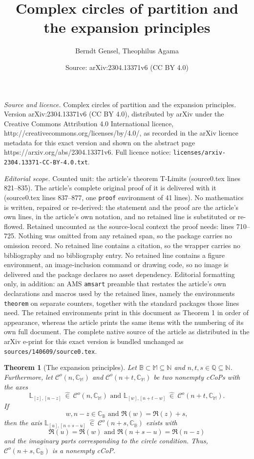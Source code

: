 \documentclass[10pt,a4paper]{amsart}
\title{Complex circles of partition and the expansion principles}
\author{Berndt Gensel, Theophilus Agama}
\date{Source: arXiv:2304.13371v6 (CC BY 4.0)}
\newtheorem{theorem}{Theorem}
\newcommand{\B}{\mathbb{B}}
\newcommand{\C}{\mathcal{C}}
\newcommand{\CC}{\mathbb{C}}
\newcommand{\LL}{\mathbb{L}}
\newcommand{\M}{\mathbb{M}}
\newcommand{\N}{\mathbb{N}}
\newcommand{\inn}{~ \hat{\in}~ }
\begin{document}
\maketitle

\noindent\emph{Source and licence.} Complex circles of partition and the expansion principles. Version arXiv:2304.13371v6 (CC BY 4.0), distributed by arXiv under the Creative Commons Attribution 4.0 International licence, http://creativecommons.org/licenses/by/4.0/, as recorded in the arXiv licence metadata for this exact version and shown on the abstract page https://arxiv.org/abs/2304.13371v6. Full licence notice: \texttt{licenses/arxiv-2304.13371-CC-BY-4.0.txt}.\par\smallskip

\noindent\textit{Editorial scope.} Counted unit: the article's theorem T-Limits (source0.tex lines 821--835). The article's complete original proof of it is delivered with it (source0.tex lines 837--877, one \texttt{proof} environment of 41 lines). No mathematics is written, repaired or re-derived: the statement and the proof are the article's own lines, in the article's own notation, and no retained line is substituted or re-flowed.  Retained uncounted as the source-local context the proof needs: lines 710--725.  Nothing was omitted from any retained span, so the package carries no omission record.  No retained line contains a citation, so the wrapper carries no bibliography and no bibliography entry.  No retained line contains a figure environment, an image-inclusion command or drawing code, so no image is delivered and the package declares no asset dependency.  Editorial formatting only, in addition: an AMS \texttt{amsart} preamble that restates the article's own declarations and macros used by the retained lines, namely the environments \texttt{theorem} on separate counters, together with the standard packages those lines need.  The retained environments print in this document as Theorem 1 in order of appearance, whereas the article prints the same items with the numbering of its own full document.  The complete native source of the article as distributed in the arXiv e-print for this exact version is bundled unchanged as \texttt{sources/140609/source0.tex}.
\begin{theorem}[The expansion principles]\label{T-Expansion}
Let $\B\subset\M\subseteq\N$ and $n,t,s\in\mathbb{Q}\subseteq\N$. Furthermore, let $\C^o(n,\CC_{\M})$ and $\C^o(n+t,\CC_{\M})$
be two nonempty cCoPs with the axes 
\[
\LL_{[z],[n-z]}\inn\C^o(n,\CC_{\M})\mbox{ and }\LL_{[w],[n+t-w]} \inn \C^o(n+t,\CC_{\M}). 
\]
If 
\[
w,n-z\in\CC_{\B}\mbox{ and }\Re(w)=\Re(z)+s, 
\]
then the axis $\LL_{[u],[n+s-u]}\inn \C^o(n+s,\CC_{\B})$ exists with
\[
\Re(u)=\Re(w) \mbox{ and }\Re(n+s-u)=\Re(n-z)
\]
and the imaginary parts corresponding to the \emph{circle condition}. Thus, $\C^o(n+s,\CC_{\B})$ is a nonempty cCoP.
\end{theorem}
\end{document}
